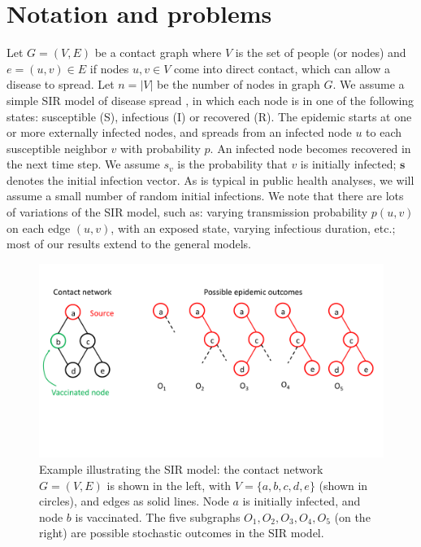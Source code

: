 \section{Notation and problems}
\label{sec:prelim}
Let $G = (V, E)$ be a contact graph where $V$ is the set of people (or nodes) and $e = (u, v) \in E$ if nodes $u, v \in V$ come into direct contact, which can allow a disease to spread. Let $n = |V|$ be the number of nodes in graph $G$. 
We assume a simple SIR model of disease spread \cite{marathe:cacm13}, in which each node is in one of the following states:
susceptible (S), infectious (I) or recovered (R).
The epidemic starts at one or more externally infected nodes, and spreads from an infected node $u$ to each susceptible
neighbor $v$ with probability $p$. An infected node becomes recovered in the next time step.
We assume $s_v$ is the probability that $v$ is initially infected; $\mathbf{s}$ denotes the initial infection vector.
As is typical in public health analyses, we will assume a small number of random initial infections.
We note that there are lots of variations of the SIR model, such as:
varying transmission probability $p(u, v)$ on each edge $(u, v)$,
with an exposed state, varying infectious duration, etc.;
most of our results extend to the general models.

\begin{figure}
\includegraphics[scale=0.25]{figures/example.pdf}
\caption{Example illustrating the SIR model: the contact network $G=(V, E)$ is shown in the left,
with $V=\{a, b, c, d, e\}$ (shown in circles), and edges as solid lines.
Node $a$ is initially infected, and node $b$ is vaccinated. The five subgraphs $O_1, O_2, O_3, O_4, O_5$
(on the right) are possible stochastic outcomes in the SIR model.}
\label{fig:example}
\end{figure}

